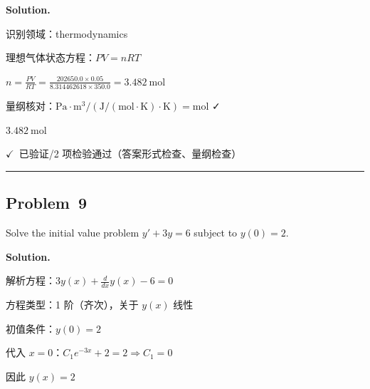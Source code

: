 \documentclass[12pt, a4paper]{article}
\newcommand{\problem}[1]{\subsection*{Problem~#1}}
\newcommand{\solution}{%
  \par\noindent
  {\color{solutiongreen}\bfseries Solution.}\par
}
\newcommand{\verifyok}{\textcolor{solutiongreen}{\ensuremath{\checkmark}\ 已验证}}
\begin{document}
\solution

\begin{stepbox}
识别领域：thermodynamics
\end{stepbox}

\begin{stepbox}
理想气体状态方程：$PV = nRT$
\end{stepbox}

\begin{stepbox}
$n = \frac{PV}{RT} = \frac{202650.0\times0.05}{8.314462618\times350.0} = 3.482\ \mathrm{mol}$
\end{stepbox}

\begin{stepbox}
量纲核对：$\mathrm{Pa\cdot m^3}/(\mathrm{J/(mol\cdot K)}\cdot\mathrm{K}) = \mathrm{mol}$ ✓
\end{stepbox}

\begin{center}
$\boxed{3.482\ \mathrm{mol}}$
\end{center}

\begin{verifybox}\small \verifyok{}/2 项检验通过（答案形式检查、量纲检查） \end{verifybox}

\vspace{0.8em}\hrule\vspace{0.8em}

\problem{9}

\begin{stepbox}
Solve the initial value problem $y' + 3y = 6$ subject to $y(0) = 2$.
\end{stepbox}

\solution

\begin{stepbox}
解析方程：$3 y{\left(x \right)} + \frac{d}{d x} y{\left(x \right)} - 6 = 0$
\end{stepbox}

\begin{stepbox}
方程类型：1 阶（齐次），关于 $y(x)$ 线性
\end{stepbox}

\begin{stepbox}
初值条件：$y(0) = 2$
\end{stepbox}

\begin{stepbox}
代入 $x = 0$：$C_{1} e^{- 3 x} + 2 = 2$$\Rightarrow C_{1} = 0$
\end{stepbox}

\begin{stepbox}
因此 $y(x) = 2$
\end{stepbox}
\end{document}
